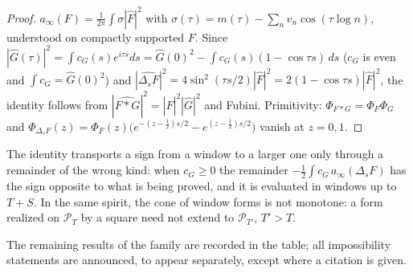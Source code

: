 \documentclass[11pt]{amsart}
\theoremstyle{definition}
\theoremstyle{remark}
\numberwithin{equation}{section}
\newcommand{\Fh}{\widehat F}                           %
\newcommand{\PhiF}{\Phi_F}                             %
\newcommand{\PT}{\mathcal{P}_T}                        %
\begin{document}
\begin{proof}
$a_\infty(F)=\frac1{2\pi}\int\sigma|\Fh|^2$ with $\sigma(\tau)=m(\tau)-\sum_nv_n\cos(\tau\log n)$, understood on compactly supported $F$.
Since $|\widehat G(\tau)|^2=\int c_G(s)e^{i\tau s}ds=\widehat G(0)^2-\int c_G(s)(1-\cos\tau s)\,ds$ ($c_G$ is even and $\int c_G=\widehat G(0)^2$)
and $|\widehat{\Delta_sF}|^2=4\sin^2(\tau s/2)|\Fh|^2=2(1-\cos\tau s)|\Fh|^2$, the identity follows from $|\widehat{F*G}|^2=|\Fh|^2|\widehat G|^2$
and Fubini. Primitivity: $\Phi_{F*G}=\PhiF\Phi_G$ and $\Phi_{\Delta_sF}(z)=\PhiF(z)\big(e^{-(z-\frac12)s/2}-e^{(z-\frac12)s/2}\big)$ vanish at $z=0,1$.
\end{proof}

The identity transports a sign from a window to a larger one only through a remainder of the wrong kind: when $c_G\ge0$ the remainder
$-\frac12\int c_G\,a_\infty(\Delta_sF)$ has the sign opposite to what is being proved, and it is evaluated in windows up to $T+S$. In
the same spirit, the cone of window forms is not monotone: a form realized on $\PT$ by a square need not extend to $\mathcal P_{T'}$, $T'>T$.

The remaining results of the family are recorded in the table; all impossibility statements are announced, to appear separately,
except where a citation is given.
\end{document}
